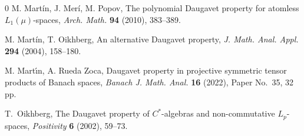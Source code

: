 \documentclass[10pt]{amsart}
\begin{document}
\begin{thebibliography}{0}
		 M. Mart\'in, J. Mer\'i, M. Popov, The polynomial Daugavet property for atomless $L_1(\mu)$-spaces, \emph{Arch. Math.} \textbf{94} (2010), 383--389.
		
		 M. Mart{\'i}n, T. Oikhberg, An alternative Daugavet property, \emph{J. Math. Anal. Appl.} \textbf{294} (2004), 158--180.
		
		 M. Mart\'{\i}n, A. Rueda Zoca, Daugavet property in projective symmetric tensor products of Banach spaces, \emph{Banach J. Math. Anal.} \textbf{16} (2022), Paper No.~35, 32 pp.
		
		
		
		
		
		
		
		
		
		
		 T.~Oikhberg, The Daugavet property of $C^*$-algebras and non-commutative $L_p$-spaces, \emph{Positivity} \textbf{6} (2002), 59--73.
		
		

\end{thebibliography}
\end{document}
